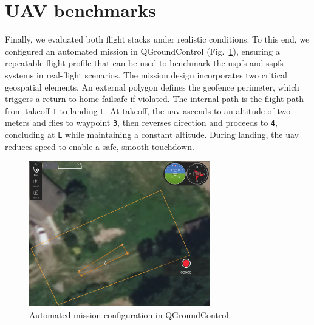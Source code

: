 \section{UAV benchmarks}
\label{sec:uav-benchmarks}
Finally, we evaluated both flight stacks under realistic conditions.
To this end, we configured an automated mission in QGroundControl
(Fig.~\ref{fig:mission-final}), ensuring a repeatable flight profile that can be used
to benchmark the \gls{uspfs} and \gls{sspfs} systems in real-flight scenarios.
%
The mission design incorporates two critical geospatial elements. An
external polygon defines the geofence perimeter, which triggers a
return-to-home failsafe if violated. The internal path is the flight path from
takeoff \lstinline{T} to landing \lstinline{L}. At takeoff, the \gls{uav} ascends
to an altitude of two meters and flies to waypoint \lstinline{3}, then reverses
direction and proceeds to \lstinline{4}, concluding at \lstinline{L} while maintaining a constant altitude. During landing, the \gls{uav} reduces speed to enable a safe, smooth touchdown.

\begin{figure}[!hbt]
  \centering
  \includegraphics[width=0.7\textwidth]{./img/png/mission-final} 
  \caption{Automated mission configuration in QGroundControl}%
  \label{fig:mission-final}
\end{figure}

